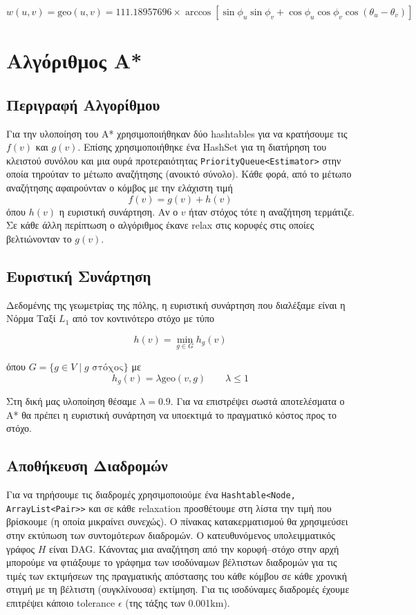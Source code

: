 \documentclass[a4paper,12pt]{article}
\begin{document}
$$w(u, v) = \mathrm{geo}(u, v) = 111.18957696 \times \arccos \left [ \sin \phi_u \sin \phi_v + \cos \phi_u \cos \phi_v \cos (\theta_u - \theta_v) \right ]$$



\section{Αλγόριθμος Α*}

\subsection{Περιγραφή Αλγορίθμου}
Για την υλοποίηση του Α* χρησιμοποιήθηκαν δύο hashtables για να κρατήσουμε τις $f(v)$ και $g(v)$. Επίσης χρησιμοποιήθηκε ένα HashSet για τη διατήρηση του κλειστού συνόλου και μια ουρά προτεραιότητας \texttt{PriorityQueue<Estimator>} στην οποία τηρούταν το μέτωπο αναζήτησης (ανοικτό σύνολο). Κάθε φορά, από το μέτωπο αναζήτησης αφαιρούνταν ο κόμβος με την ελάχιστη τιμή $$f(v) = g(v) + h(v)$$ όπου $h(v)$ η ευριστική συνάρτηση. Αν ο $v$ ήταν στόχος τότε η αναζήτηση τερμάτιζε. Σε κάθε άλλη περίπτωση ο αλγόριθμος έκανε relax στις κορυφές στις οποίες βελτιώνονταν το $g(v)$. 

\subsection{Ευριστική Συνάρτηση}

Δεδομένης της γεωμετρίας της πόλης, η ευριστική συνάρτηση που διαλέξαμε είναι η Νόρμα Ταξί $L_1$ από τον κοντινότερο στόχο με τύπο 

$$h(v) = \min_{g \in G} h_g(v)$$

όπου $G = \{ g \in V \mid g \text{ στόχος} \}$ με $$h_g(v) = \lambda \mathrm{geo}(v, g) \qquad \lambda \le 1$$
 
Στη δική μας υλοποίηση θέσαμε $\lambda=0.9$. Για να επιστρέψει σωστά αποτελέσματα ο Α* θα πρέπει η ευριστική συνάρτηση να υποεκτιμά το πραγματικό κόστος προς το στόχο.
\subsection{Αποθήκευση Διαδρομών} 

Για να τηρήσουμε τις διαδρομές χρησιμοποιούμε ένα \texttt{Hashtable<Node, ArrayList<Pair>>} και σε κάθε relaxation προσθέτουμε στη λίστα την τιμή που βρίσκουμε (η οποία μικραίνει συνεχώς). Ο πίνακας κατακερματισμού θα χρησιμεύσει στην εκτύπωση των συντομότερων διαδρομών. Ο κατευθυνόμενος υπολειμματικός γράφος $H$ είναι DAG. Κάνοντας μια αναζήτηση από την κορυφή--στόχο στην αρχή μπορούμε να φτιάξουμε το γράφημα των ισοδύναμων βέλτιστων διαδρομών για τις τιμές των εκτιμήσεων της πραγματικής απόστασης του κάθε κόμβου σε κάθε χρονική στιγμή με τη βέλτιστη (συγκλίνουσα) εκτίμηση. Για τις ισοδύναμες διαδρομές έχουμε επιτρέψει κάποιο tolerance $\epsilon$ (της τάξης των 0.001km).  
\end{document}
